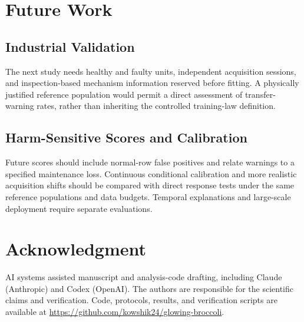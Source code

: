 \documentclass[conference]{IEEEtran}
\begin{document}
\section{Future Work}
\subsection{Industrial Validation}
The next study needs healthy and faulty units, independent acquisition sessions, and inspection-based mechanism information reserved before fitting. A physically justified reference population would permit a direct assessment of transfer-warning rates, rather than inheriting the controlled training-law definition.

\subsection{Harm-Sensitive Scores and Calibration}
Future scores should include normal-row false positives and relate warnings to a specified maintenance loss. Continuous conditional calibration and more realistic acquisition shifts should be compared with direct response tests under the same reference populations and data budgets. Temporal explanations and large-scale deployment require separate evaluations.

\section*{Acknowledgment}
AI systems assisted manuscript and analysis-code drafting, including Claude (Anthropic) and Codex (OpenAI). The authors are responsible for the scientific claims and verification. Code, protocols, results, and verification scripts are available at \url{https://github.com/kowshik24/glowing-broccoli}.


\end{document}
